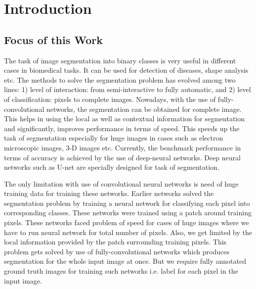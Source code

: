 %


\chapter{Introduction}

\section{Focus of this Work}
The task of image segmentation into binary classes is very useful in different cases in biomedical tasks. It can be used for detection of diseases, shape analysis etc. The methods to solve the segmentation problem has evolved among two lines: 1) level of interaction: from semi-interactive to fully automatic, and 2) level of classification: pixels to complete images. Nowadays, with the use of fully-convolutional networks, the segmentation can be obtained for complete image. This helps in using the local as well as contextual information for segmentation and significantly, improves performance in terms of speed. This speeds up the task of segmentation especially for huge images in cases such as electron microscopic images, 3-D images etc. Currently, the benchmark performance in terms of accuracy is achieved by the use of deep-neural networks. Deep neural networks such as U-net are specially designed for task of segmentation.
\par The only limitation with use of convolutional neural networks is need of huge training data for training these networks. Earlier networks solved the segmentation problem by training a neural network for classifying each pixel into corresponding classes. These networks were trained using a patch around training pixels. These networks faced problem of speed for cases of huge images where we have to run neural network for total number of pixels. Also, we get limited by the local information provided by the patch surrounding training pixels. This problem gets solved by use of fully-convolutional networks which produces segmentation for the whole input image at once. But we require fully annotated ground truth images for training such networks i.e. label for each pixel in the input image.  

